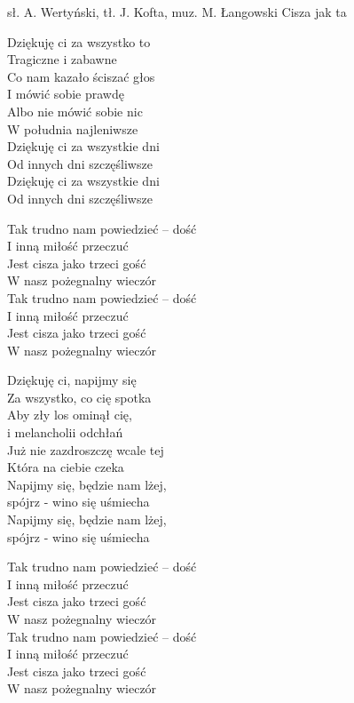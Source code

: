 {sł. A. Wertyński, tł. J. Kofta, muz. M. Łangowski}
{Cisza jak ta}
\begin{text}
    \hfill\break
    \hfill\break
    \hfill\break
    \hfill\break
Dziękuję ci za wszystko to \\
Tragiczne i zabawne \\
Co nam kazało ściszać głos \\
I mówić sobie prawdę \\
Albo nie mówić sobie nic \\
W południa najleniwsze \\
Dziękuję ci za wszystkie dni \\
Od innych dni szczęśliwsze \\
Dziękuję ci za wszystkie dni \\
Od innych dni szczęśliwsze

\vin Tak trudno nam powiedzieć – dość \\
\vin I inną miłość przeczuć \\
\vin Jest cisza jako trzeci gość \\
\vin W nasz pożegnalny wieczór \\
\vin Tak trudno nam powiedzieć – dość \\
\vin I inną miłość przeczuć \\
\vin Jest cisza jako trzeci gość \\
\vin W nasz pożegnalny wieczór

    \hfill\break
    \hfill\break
Dziękuję ci, napijmy się \\
Za wszystko, co cię spotka \\
Aby zły los ominął cię, \\
i melancholii odchłań \\
Już nie zazdroszczę wcale tej \\
Która na ciebie czeka \\
Napijmy się, będzie nam lżej, \\
spójrz - wino się uśmiecha \\
Napijmy się, będzie nam lżej, \\
spójrz - wino się uśmiecha

\vin Tak trudno nam powiedzieć – dość \\
\vin I inną miłość przeczuć \\
\vin Jest cisza jako trzeci gość \\
\vin W nasz pożegnalny wieczór \\
\vin Tak trudno nam powiedzieć – dość \\
\vin I inną miłość przeczuć \\
\vin Jest cisza jako trzeci gość \\
\vin W nasz pożegnalny wieczór


\end{text}
